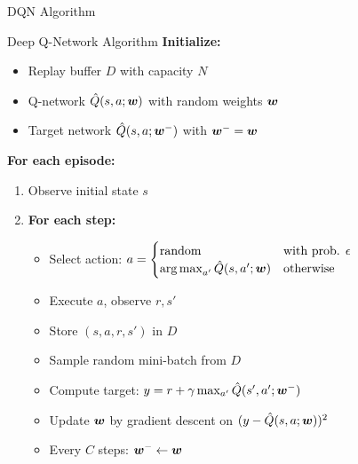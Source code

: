 \documentclass[aspectratio=169]{beamer}
\begin{document}
\begin{frame}[fragile]{DQN Algorithm}
  \begin{examplebox}{Deep Q-Network Algorithm}
    \small
    \textbf{Initialize:}
    \begin{itemize}
      \item Replay buffer $D$ with capacity $N$
      \item Q-network $\hat{Q}(s,a;\boldsymbol{w})$ with random weights $\boldsymbol{w}$
      \item Target network $\hat{Q}(s,a;\boldsymbol{w}^-)$ with $\boldsymbol{w}^- = \boldsymbol{w}$
    \end{itemize}

    \textbf{For each episode:}
    \begin{enumerate}
      \item Observe initial state $s$
      \item \textbf{For each step:}
      \begin{itemize}
        \item Select action: $a = \begin{cases} \text{random} & \text{with prob. } \epsilon \\ \operatorname*{arg\,max}_{a'} \hat{Q}(s,a';\boldsymbol{w}) & \text{otherwise} \end{cases}$
        \item Execute $a$, observe $r, s'$
        \item Store $(s,a,r,s')$ in $D$
        \item Sample random mini-batch from $D$
        \item Compute target: $y = r + \gamma \max_{a'} \hat{Q}(s',a';\boldsymbol{w}^-)$
        \item Update $\boldsymbol{w}$ by gradient descent on $(y - \hat{Q}(s,a;\boldsymbol{w}))^2$
        \item Every $C$ steps: $\boldsymbol{w}^- \leftarrow \boldsymbol{w}$
      \end{itemize}
    \end{enumerate}
  \end{examplebox}
\end{frame}
\end{document}
